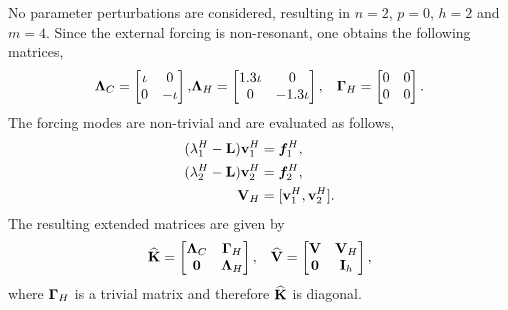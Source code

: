 No parameter perturbations are considered, resulting in $n=2$, $p=0$, $h=2$ and $m=4$. Since the external forcing is non-resonant, one obtains the following matrices,
\begin{align}
	\mathbf{\Lambda}_{C} = 
	\begin{bmatrix}
		\iota & 0 \\ 
		0 &  -\iota 
	\end{bmatrix}, &
	\mathbf{\Lambda}_{H} = 
	\begin{bmatrix}
		1.3\iota & 0 \\ 
		0 &  -1.3\iota 
	\end{bmatrix}, &
	\mathbf{\Gamma}_{H} = 
	\begin{bmatrix}
		0 & 0 \\ 
		0 &  0 
	\end{bmatrix}. \nonumber 
\end{align}
The forcing modes are non-trivial and are evaluated as follows,
\begin{align}
	(\lambda^{H}_{1} - \mathbf{L})\mathbf{v}^{H}_{1} &= \boldsymbol{f}^{H}_{1}, \nonumber \\
	(\lambda^{H}_{2} - \mathbf{L})\mathbf{v}^{H}_{2} &= \boldsymbol{f}^{H}_{2}, \nonumber \\
	\mathbf{V}_{H} &= [\mathbf{v}^{H}_{1}, \mathbf{v}^{H}_{2}]. \nonumber
\end{align}
The resulting extended matrices are given by
\begin{align}
	\mathbf{\widehat{K}} =
	\begin{bmatrix}
		\mathbf{\Lambda}_{C} & \mathbf{\Gamma}_{H} \\ 
		\mathbf{0} &  \mathbf{\Lambda}_{H}
	\end{bmatrix}, &&
	\mathbf{\widehat{V}} =
	\begin{bmatrix}
		\mathbf{V} & \mathbf{V}_{H} \\ 
		\mathbf{0} &  \mathbf{I}_{h}
	\end{bmatrix}, \nonumber 
\end{align}
where $\mathbf{\Gamma}_{H}$ is a trivial matrix and therefore $\mathbf{\widehat{K}}$ is diagonal.

